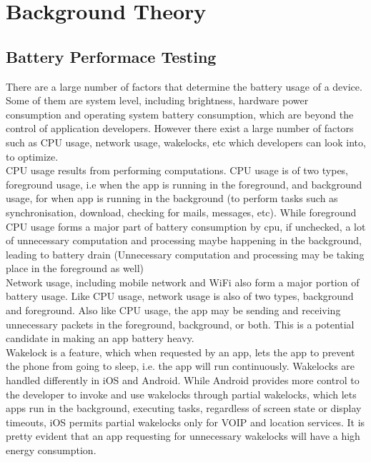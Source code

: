 \setlength\parindent{0pt}

\chapter{Background Theory}

\section{Battery Performace Testing}
There are a large number of factors that determine the battery usage of a device. Some of them are system level, including brightness, hardware power consumption and operating system battery consumption, which are beyond the control of application developers. However there exist a large number of factors such as CPU usage, network usage, wakelocks, etc which developers can look into, to optimize. \\

CPU usage results from performing computations. CPU usage is of two types, foreground usage, i.e when the app is running in the foreground, and background usage, for when app is running in the background (to perform tasks such as synchronisation, download, checking for mails, messages, etc). While foreground CPU usage forms a major part of battery consumption by cpu, if unchecked, a lot of unnecessary computation and processing maybe happening in the background, leading to battery drain (Unnecessary computation and processing may be taking place in the foreground as well) \\

Network usage, including mobile network and WiFi also form a major portion of battery usage. Like CPU usage, network usage is also of two types, background and foreground. Also like CPU usage, the app may be sending and receiving unnecessary packets in the foreground, background, or both. This is a potential candidate in making an app battery heavy.\\

Wakelock is a feature, which when requested by an app, lets the app to prevent the phone from going to sleep, i.e. the app will run continuously.\cite{wakelock} Wakelocks are handled differently in iOS and Android. While Android provides more control to the developer to invoke and use wakelocks through partial wakelocks, which lets apps run in the background, executing tasks, regardless of screen state or display timeouts, iOS permits partial wakelocks only for VOIP and location services.\cite{stackoverflow} It is pretty evident that an app requesting for unnecessary wakelocks will have a high energy consumption.\\

